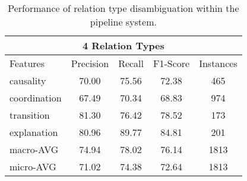\begin{table}[ht]
\centering
\begin{tabular}{|l|c|c|c|c|}
\hline

\multicolumn{5}{|c|}{4 Relation Types}                                          \\ \hline
Features            &     Precision &     Recall &     F1-Score &     Instances \\ \hline
causality           &     70.00     &     75.56  &     72.38    &     465       \\ \hline
coordination        &     67.49     &     70.34  &     68.83    &     974       \\ \hline
transition          &     81.30     &     76.42  &     78.52    &     173       \\ \hline
explanation         &     80.96     &     89.77  &     84.81    &     201       \\ \hline
macro-AVG           &     74.94     &     78.02  &     76.14    &     1813      \\ \hline
micro-AVG           &     71.02     &     74.38  &     72.64    &     1813      \\ \hline

\end{tabular}
\caption{\label{t:sense-types-pipeline} Performance of relation type
disambiguation within the pipeline system. }
\end{table}
